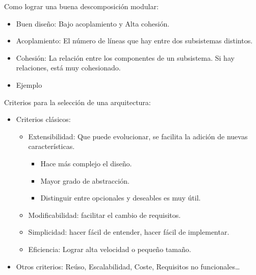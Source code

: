 \documentclass[12pt, twoside, openright]{report} %
\begin{document}
Como lograr una buena descomposición modular:

\begin{itemize}
	\item Buen diseño: Bajo acoplamiento y Alta cohesión.
	\item Acoplamiento: El número de líneas que hay entre dos subsistemas
	      distintos.
	\item Cohesión: La relación entre los componentes de un subsistema. Si
	      hay relaciones, está muy cohesionado.
	\item Ejemplo
	      \begin{figure}[H]
		      {\def\svgwidth{.8\textwidth}
			      }
	      \end{figure}

\end{itemize}
\pagebreak

Criterios para la selección de una arquitectura:

\begin{itemize}
	\item Criterios clásicos:
	      \begin{itemize}
		      \item Extensibilidad: Que puede evolucionar, se facilita la adición de
		            nuevas características.
		            \begin{itemize}
			            \item Hace más complejo el diseño.
			            \item Mayor grado de abstracción.
			            \item Distinguir entre opcionales y deseables es muy útil.
		            \end{itemize}
		      \item Modificabilidad: facilitar el cambio de requisitos.
		      \item Simplicidad: hacer fácil de entender, hacer fácil de
		            implementar.
		      \item Eficiencia: Lograr alta velocidad o pequeño tamaño.
	      \end{itemize}
	\item Otros criterios: Reúso, Escalabilidad, Coste, Requisitos no
	      funcionales\ldots{}
\end{itemize}
\end{document}
